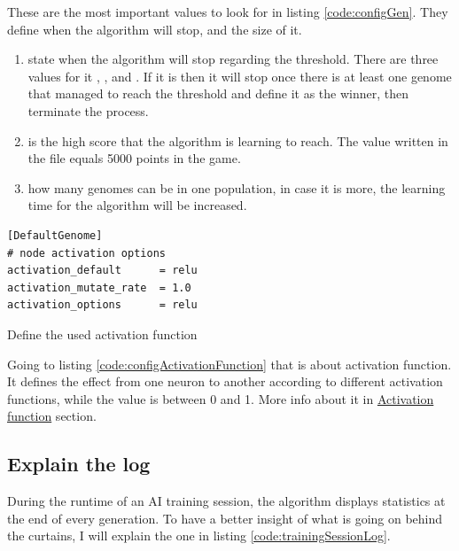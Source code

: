 These are the most important values to look for in listing \ref{code:configGen}. They define when the algorithm will stop, and the size of it.

\begin{enumerate}
\item {} state when the algorithm will stop regarding the threshold. There are three values for it , , and . If it is  then it will stop once there is at least one genome that managed to reach the threshold and define it as the winner, then terminate the process.

\item {} is the high score that the algorithm is learning to reach. The value written in the file equals 5000 points in the game.

\item {} how many genomes can be in one population, in case it is more, the learning time for the algorithm will be increased.

\end{enumerate}

\begin{listing}[H]
\begin{verbatim}
[DefaultGenome]
# node activation options
activation_default      = relu
activation_mutate_rate  = 1.0
activation_options      = relu
\end{verbatim}
\caption{Define the used activation function}
\label{code:configActivationFunction}
\end{listing}

Going to listing \ref{code:configActivationFunction} that is about activation function. It defines the effect from one neuron to another according to different activation functions, while the value is between 0 and 1. More info about it in \hyperref[sec:activation-function]{Activation function} section.  


\subsection{Explain the log}\label{sec:explain-the-log}

During the runtime of an AI training session, the algorithm displays statistics at the end of every generation. To have a better insight of what is going on behind the curtains, I will explain the one in listing \ref{code:trainingSessionLog}.

